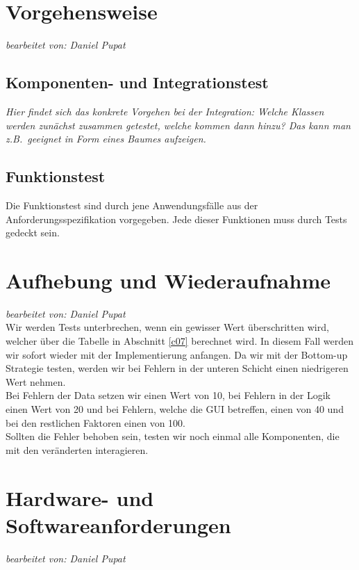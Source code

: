 \documentclass[fontsize=12pt,paper=a4,twoside]{scrartcl}
\begin{document}
\section{Vorgehensweise}\label{c06}
\textit{bearbeitet von: Daniel Pupat }\\

\subsection{Komponenten- und Integrationstest}


{\em Hier findet sich das konkrete Vorgehen bei der Integration: Welche
  Klassen werden zunächst zusammen getestet, welche kommen dann hinzu?
 Das kann man z.B.\ geeignet in Form eines Baumes aufzeigen.}


\subsection{Funktionstest}

Die Funktionstest sind durch jene Anwendungsfälle aus der Anforderungsspezifikation vorgegeben. Jede dieser Funktionen muss durch Tests gedeckt sein.


\section{Aufhebung und Wiederaufnahme}\label{c08}
\textit{bearbeitet von: Daniel Pupat }\\

Wir werden Tests unterbrechen, wenn ein gewisser Wert überschritten wird, welcher über die Tabelle in Abschnitt  \ref{c07} berechnet wird. In diesem Fall werden wir sofort wieder mit der Implementierung anfangen. Da wir mit der Bottom-up Strategie testen, werden wir bei Fehlern in der unteren Schicht einen niedrigeren Wert nehmen.\\
Bei Fehlern der Data setzen wir einen Wert von 10, bei Fehlern in der Logik einen Wert von 20 und bei Fehlern, welche die GUI betreffen, einen von 40 und bei den restlichen Faktoren einen von 100.\\
Sollten die Fehler behoben sein, testen wir noch einmal alle Komponenten, die mit den veränderten interagieren.

\section{Hardware- und Softwareanforderungen}\label{c09}
\textit{bearbeitet von: Daniel Pupat }\\
\end{document}
